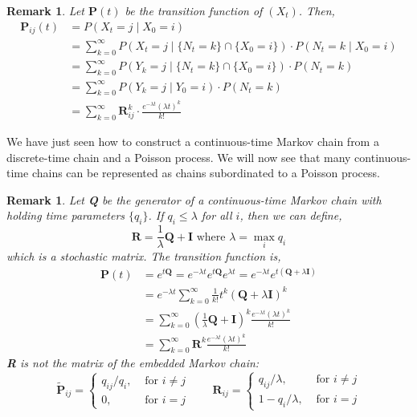 \documentclass{tufte-handout}
\newtheorem{rmk}[thm]{Remark}
\begin{document}
 \begin{rmk}
   Let $\mathbf{P}(t)$ be the transition function of $(X_t)$. Then,
   \begin{align*}
     \mathbf{P}_{ij}(t) &= P(X_t = j \mid X_0 = i) \\
                        &= \sum_{k=0}^{\infty} P\left(X_{t}=j \mid \{N_{t}=k\} \cap \{X_{0}=i\}\right) \cdot P\left(N_{t}=k \mid X_{0}=i\right) \\
                        &=\sum_{k=0}^{\infty} P\left(Y_{k}=j \mid \{N_{t}=k\} \cap \{X_{0}=i\}\right) \cdot P\left(N_{t}=k\right) \\
                        &=\sum_{k=0}^{\infty} P\left(Y_{k}=j \mid Y_{0}=i\right) \cdot P\left(N_{t}=k\right) \\
                        &=\sum_{k=0}^{\infty} \mathbf{R}_{i j}^{k} \cdot \frac{e^{-\lambda t}(\lambda t)^{k}}{k !}
   \end{align*}
 \end{rmk}

  We have just seen how to construct a continuous-time Markov chain from a discrete-time chain and a Poisson process. We will now see that many continuous-time chains can be represented as chains subordinated to a Poisson process.

   \begin{rmk}
    Let \textbf{Q} be the generator of a continuous-time Markov chain with holding time parameters $\{q_i\}$. If $q_i \leq \lambda$ for all $i$, then we can define,
    \[\mathbf{R} = \frac{1}{\lambda} \mathbf{Q} + \mathbf{I} \text{ where $\lambda = \max_i q_i$}\]
    \noindent which is a stochastic matrix. The transition function is,
    \begin{align*}
      \boldsymbol{P}(t) &=e^{t \boldsymbol{Q}}=e^{-\lambda t} e^{t \boldsymbol{Q}} e^{\lambda t}=e^{-\lambda t} e^{t(\boldsymbol{Q}+\lambda \boldsymbol{I})} \\
      &=e^{-\lambda t} \sum_{k=0}^{\infty} \frac{1}{k !} t^{k}(\boldsymbol{Q}+\lambda \boldsymbol{I})^{k} \\
      &=\sum_{k=0}^{\infty}\left(\frac{1}{\lambda} \boldsymbol{Q}+\boldsymbol{I}\right)^{k} \frac{e^{-\lambda t}(\lambda t)^{k}}{k !} \\
      &=\sum_{k=0}^{\infty} \boldsymbol{R}^{k} \frac{e^{-\lambda t}(\lambda t)^{k}}{k !}
    \end{align*}
    \noindent \textbf{R} is not the matrix of the embedded Markov chain:
    \[
    \tilde{\mathbf{P}}_{i j}= \begin{cases}q_{i j} / q_{i}, & \text { for } i \neq j \\ 0, & \text { for } i=j\end{cases} \quad \quad \mathbf{R}_{i j}= \begin{cases}q_{i j} / \lambda, & \text { for } i \neq j \\ 1-q_{i} / \lambda, & \text { for } i=j\end{cases}
    \]
  \end{rmk}
\end{document}
